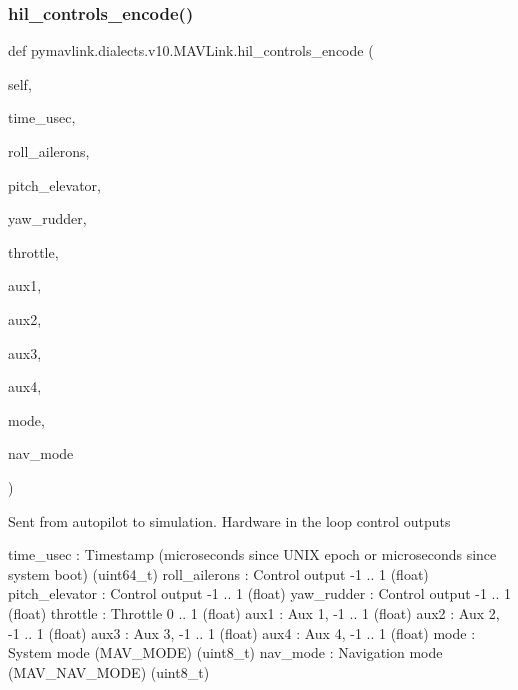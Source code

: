 \begin{DoxyVerb}
\begin{DoxyVerb}
\subsubsection{\texorpdfstring{hil\+\_\+controls\+\_\+encode()}{hil\_controls\_encode()}}
{\footnotesize\ttfamily def pymavlink.\+dialects.\+v10.\+M\+A\+V\+Link.\+hil\+\_\+controls\+\_\+encode (\begin{DoxyParamCaption}\item[{}]{self,  }\item[{}]{time\+\_\+usec,  }\item[{}]{roll\+\_\+ailerons,  }\item[{}]{pitch\+\_\+elevator,  }\item[{}]{yaw\+\_\+rudder,  }\item[{}]{throttle,  }\item[{}]{aux1,  }\item[{}]{aux2,  }\item[{}]{aux3,  }\item[{}]{aux4,  }\item[{}]{mode,  }\item[{}]{nav\+\_\+mode }\end{DoxyParamCaption})}

\begin{DoxyVerb}Sent from autopilot to simulation. Hardware in the loop control
outputs

time_usec                 : Timestamp (microseconds since UNIX epoch or microseconds since system boot) (uint64_t)
roll_ailerons             : Control output -1 .. 1 (float)
pitch_elevator            : Control output -1 .. 1 (float)
yaw_rudder                : Control output -1 .. 1 (float)
throttle                  : Throttle 0 .. 1 (float)
aux1                      : Aux 1, -1 .. 1 (float)
aux2                      : Aux 2, -1 .. 1 (float)
aux3                      : Aux 3, -1 .. 1 (float)
aux4                      : Aux 4, -1 .. 1 (float)
mode                      : System mode (MAV_MODE) (uint8_t)
nav_mode                  : Navigation mode (MAV_NAV_MODE) (uint8_t)\end{DoxyVerb}
 \mbox{\label{classpymavlink_1_1dialects_1_1v10_1_1MAVLink_ac40f22199a95772faabdb88e7281e01a}} 

\end{DoxyVerb}
\end{DoxyVerb}
